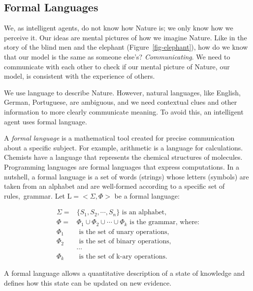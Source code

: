 \documentclass[
  letterpaper,
  12pt,
  british]{tufte-book}
\theoremstyle{plain}
\theoremstyle{plain}
\theoremstyle{definition}
\theoremstyle{remark}
\begin{document}
\hypertarget{sec-formal_language}{%
\subsection{Formal Languages}\label{sec-formal_language}}

We, as intelligent agents, do not know how Nature is; we only know how
we perceive it. Our ideas are mental pictures of how we imagine Nature.
Like in the story of the blind men and the elephant
(Figure~\ref{fig-elephant}), how do we know that our model is the same
as someone else's? \emph{Communicating}. We need to communicate with
each other to check if our mental picture of Nature, our model, is
consistent with the experience of others.

We use language to describe Nature. However, natural languages, like
English, German, Portuguese, are ambiguous, and we need contextual clues
and other information to more clearly communicate meaning. To avoid
this, an intelligent agent uses formal language.

A \emph{formal language} is a mathematical tool created for precise
communication about a specific subject. For example, arithmetic is a
language for calculations. Chemists have a language that represents the
chemical structures of molecules. Programming languages are formal
languages that express computations. In a nutshell, a formal language is
a set of words (strings) whose letters (symbols) are taken from an
alphabet and are well-formed according to a specific set of
rules,~grammar. Let \(\mathrm{L}= <\Sigma, \Phi>\) be a formal language:

\begin{align}
    \Sigma =& \{S_1, S_2, \cdots, S_n\} \text{ is an alphabet,}\\
    \Phi =& {\Phi_1 \cup \Phi_2 \cup \cdots \cup \Phi_k} \text{ is the grammar, where:}\\
    \Phi_1 &\text{ is the set of unary operations}, \nonumber\\
    \Phi_2 &\text{ is the set of binary operations}, \nonumber\\
    &\cdots \nonumber \\
    \Phi_k &\text{ is the set of k-ary operations.}\nonumber
\end{align}

A formal language allows a quantitative description of a state of
knowledge and defines how this state can be updated on new
evidence.
\end{document}
